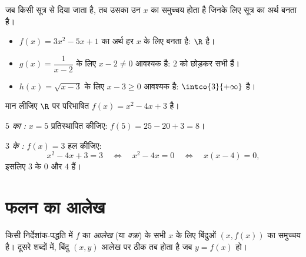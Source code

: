 \begin{example}[प्रांत ज्ञात करना]\label{ex:g10:functions:domain}
जब  किसी सूत्र से दिया जाता है, तब उसका  उन $x$ का समुच्चय होता है
जिनके लिए सूत्र का अर्थ बनता है।
\begin{itemize}
  \item $f(x) = 3x^2 - 5x + 1$ का अर्थ हर $x$ के लिए बनता है:  $\R$ है।
  \item $g(x) = \dfrac{1}{x - 2}$ के लिए $x - 2 \neq 0$ आवश्यक है:  $2$ को छोड़कर सभी  हैं।
  \item $h(x) = \sqrt{x - 3}$ के लिए $x - 3 \geq 0$ आवश्यक है:  $\intco{3}{+\infty}$ है।
\end{itemize}
\end{example}

\begin{example}[प्रतिबिंब और पूर्वप्रतिबिंब निकालना]\label{ex:g10:functions:images}
मान लीजिए $\R$ पर परिभाषित $f(x) = x^2 - 4x + 3$ है।

\emph{$5$ का :} $x = 5$ प्रतिस्थापित कीजिए:
$f(5) = 25 - 20 + 3 = 8$।

\emph{$3$ के :} $f(x) = 3$ हल कीजिए:
\[
x^2 - 4x + 3 = 3
\quad\Longleftrightarrow\quad
x^2 - 4x = 0
\quad\Longleftrightarrow\quad
x(x - 4) = 0,
\]
इसलिए $3$ के  $0$ और $4$ हैं।
\end{example}

\section{फलन का आलेख}

\begin{definition}[आलेख]\label{def:g10:functions:graph}
किसी निर्देशांक-पद्धति में $f$ का \emph{आलेख} (या \emph{वक्र})
 के सभी $x$ के लिए बिंदुओं $(x, f(x))$ का समुच्चय है। दूसरे शब्दों में,
बिंदु $(x, y)$ आलेख पर ठीक तब होता है जब $y = f(x)$ हो।
\end{definition}


